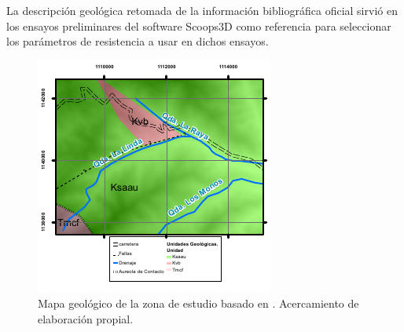 La descripci\'on geol\'ogica retomada de la informaci\'on bibliogr\'afica oficial sirvi\'o en los ensayos preliminares del software Scoops3D como referencia para seleccionar los par\'ametros de resistencia a usar en dichos ensayos.

\begin{figure}[H]
\centering
\includegraphics[scale=3]{img/geologia.pdf}
\caption{Mapa geol\'ogico de la zona de estudio basado en \cite{geol}. Acercamiento de elaboraci\'on propial.   }
\label{fig:mapageo}
\end{figure}


